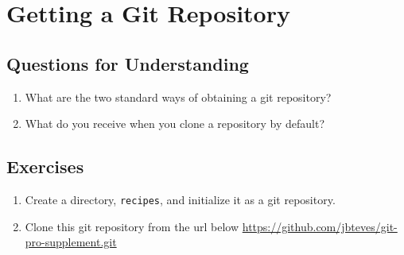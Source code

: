 \section{Getting a Git Repository}

\subsection{Questions for Understanding}
\begin{enumerate}
    \item What are the two standard ways of obtaining a git repository?
    \item What do you receive when you clone a repository by default?
\end{enumerate}

\subsection{Exercises}
\begin{enumerate}
    \item Create a directory, \verb+recipes+, and initialize it as a git
        repository.
    \item Clone this git repository from the url below
        \url{https://github.com/jbteves/git-pro-supplement.git}
\end{enumerate}

